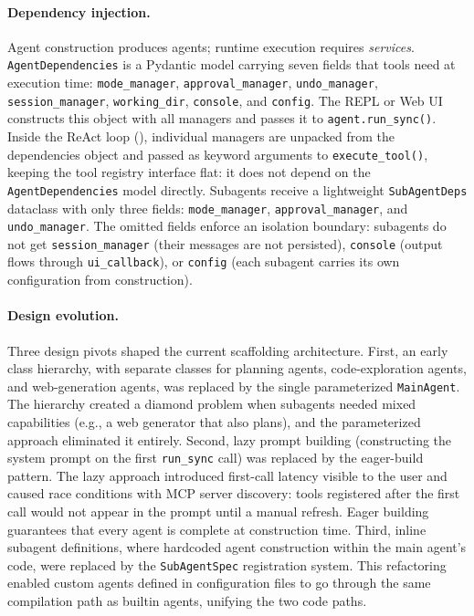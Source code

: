 \paragraph{Dependency injection.}
Agent construction produces agents; runtime execution requires \emph{services}. \texttt{AgentDependencies} is a Pydantic model carrying seven fields that tools need at execution time: \texttt{mode\_manager}, \texttt{approval\_manager}, \texttt{undo\_manager}, \texttt{session\_manager}, \texttt{working\_dir}, \texttt{console}, and \texttt{config}. The REPL or Web UI constructs this object with all managers and passes it to \texttt{agent.run\_sync()}. Inside the ReAct loop (), individual managers are unpacked from the dependencies object and passed as keyword arguments to \texttt{execute\_tool()}, keeping the tool registry interface flat: it does not depend on the \texttt{AgentDependencies} model directly. Subagents receive a lightweight \texttt{SubAgentDeps} dataclass with only three fields: \texttt{mode\_manager}, \texttt{approval\_manager}, and \texttt{undo\_manager}. The omitted fields enforce an isolation boundary: subagents do not get \texttt{session\_manager} (their messages are not persisted), \texttt{console} (output flows through \texttt{ui\_callback}), or \texttt{config} (each subagent carries its own configuration from construction).

\paragraph{Design evolution.}
Three design pivots shaped the current scaffolding architecture. First, an early class hierarchy, with separate classes for planning agents, code-exploration agents, and web-generation agents, was replaced by the single parameterized \texttt{MainAgent}. The hierarchy created a diamond problem when subagents needed mixed capabilities (e.g., a web generator that also plans), and the parameterized approach eliminated it entirely. Second, lazy prompt building (constructing the system prompt on the first \texttt{run\_sync} call) was replaced by the eager-build pattern. The lazy approach introduced first-call latency visible to the user and caused race conditions with MCP server discovery: tools registered after the first call would not appear in the prompt until a manual refresh. Eager building guarantees that every agent is complete at construction time. Third, inline subagent definitions, where hardcoded agent construction within the main agent's code, were replaced by the \texttt{SubAgentSpec} registration system. This refactoring enabled custom agents defined in configuration files to go through the same compilation path as builtin agents, unifying the two code paths.

